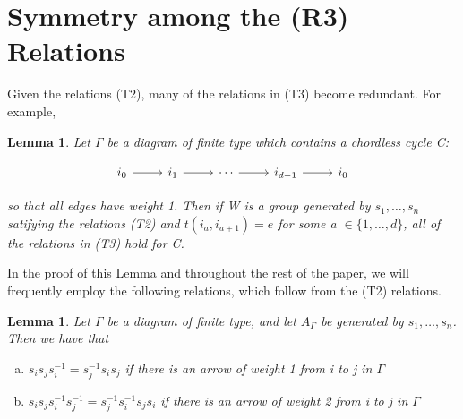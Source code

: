 \documentclass[11pt]{amsart}
\newtheorem{lem}[thm]{Lemma}
\theoremstyle{definition}
\begin{document}
\section{Symmetry among the (R3) Relations}
\label{sec:one_relation}

Given the relations (T2), many of the relations in (T3) become redundant. For example,

\begin{lem} \label{Sym-Lem}
Let $\Gamma$ be a diagram of finite type which contains a chordless cycle C:

\begin{equation*}
\begin{tikzcd}
i_0 \arrow{r} & i_1 \arrow{r} & \cdots \arrow{r} & i_{d-1} \arrow{r} & i_0
\end{tikzcd}
\end{equation*}

so that all edges have weight 1. Then if W is a group generated by $s_{1}, \dots, s_{n}$ satifying the relations (T2) and $t(i_{a}, i_{a+1}) = e$ for some a $\in \{1, \dots, d\}$, all of the relations in (T3) hold for C.
\end{lem}

In the proof of this Lemma and throughout the rest of the paper, we will frequently employ the following relations, which follow from the (T2) relations.

\begin{lem} \label{Extra-Rel}
Let $\Gamma$ be a diagram of finite type, and let $A_{\Gamma}$ be generated by $s_{1}, \dots, s_{n}$. Then we have that 
\begin{enumerate}[(a)]
\item $s_{i}s_{j}s_{i}^{-1} = s_{j}^{-1}s_{i}s_{j}$ if there is an arrow of weight 1 from i to j in $\Gamma$ \\
\item $s_{i}s_{j}s_{i}^{-1}s_{j}^{-1} = s_{j}^{-1}s_{i}^{-1}s_{j}s_{i}$ if there is an arrow of weight 2 from i to j in $\Gamma$
\end{enumerate}
\end{lem}
\end{document}
